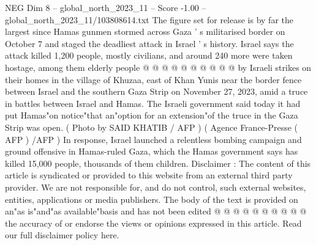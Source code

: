 \begin{textsample}{NEG Dim 8 – global\_north\_2023\_11 – Score -1.00 – global\_north\_2023\_11/103808614.txt}
The figure set for release is by far the largest since Hamas gunmen stormed across Gaza ' s militarised border on October 7 and staged the deadliest attack in Israel ' s history.
Israel says the attack killed 1,200 people, mostly civilians, and around 240 more were taken hostage, among them elderly people @ @ @ @ @ @ @ @ @ @ by Israeli strikes on their homes in the village of Khuzaa, east of Khan Yunis near the border fence between Israel and the southern Gaza Strip on November 27, 2023, amid a truce in battles between Israel and Hamas.
The Israeli government said today it had put Hamas"on notice"that an"option for an extension"of the truce in the Gaza Strip was open. ( Photo by SAID KHATIB / AFP ) ( Agence France-Presse ( AFP ) /AFP ) In response, Israel launched a relentless bombing campaign and ground offensive in Hamas-ruled Gaza, which the Hamas government says has killed 15,000 people, thousands of them children.
Disclaimer : The content of this article is syndicated or provided to this website from an external third party provider.
We are not responsible for, and do not control, such external websites, entities, applications or media publishers.
The body of the text is provided on an"as is"and"as available"basis and has not been edited @ @ @ @ @ @ @ @ @ @ the accuracy of or endorse the views or opinions expressed in this article.
Read our full disclaimer policy here.

\end{textsample}
